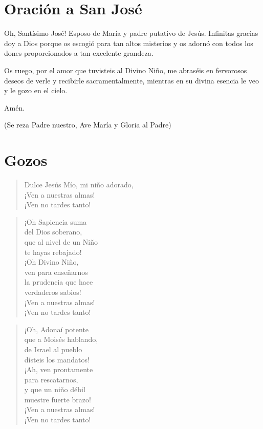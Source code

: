 \documentclass[spanish,utf8,12pt,twocolumn]{chlart}
\newenvironment{lectura}{\begingroup\color{lector}}{\endgroup\par}
\newenvironment{finalnotes}{\begingroup
	\footnotesize\sffamily\color{Gray}%
	\setlength{\leftskip}{3em}\setlength{\rightskip}{3em}\noindent
	}{\par\endgroup}
\newenvironment{gozo}{\begin{verse}\color{lector}}{\end{verse}}
\newcommand*\vena{{\color{responden}\hspace{1em}¡Ven a nuestras almas!\\\hspace{1em}¡Ven no tardes tanto!}}
\begin{document}
\section{Oración a San José}
\begin{lectura}
Oh, Santísimo José!
Esposo de María y padre putativo de Jesús.
Infinitas gracias doy a Dios porque os escogió para tan altos misterios
y os adornó con todos los dones proporcionados a tan excelente grandeza.

Os ruego, por el amor que tuvisteis al Divino Niño, me abraséis en
fervorosos deseos de verle y recibirle sacramentalmente, mientras en su
divina esencia le veo y le gozo en el cielo.

Amén.
\end{lectura}
\begin{finalnotes}
(Se reza Padre nuestro, Ave María y Gloria al Padre)
\end{finalnotes}

\section{Gozos}

\begin{gozo}
Dulce Jesús Mío, mi niño adorado,\\
\vena
\end{gozo}

\begin{gozo}
¡Oh Sapiencia suma\\del Dios soberano,\\
que al nivel de un Niño\\te hayas rebajado!\\
¡Oh Divino Niño,\\ven para enseñarnos\\
la prudencia que hace\\verdaderos sabios!\\
\vena
\end{gozo}

\begin{gozo}
¡Oh, Adonaí potente\\
que a Moisés hablando,\\
de Israel al pueblo\\
dísteis los mandatos!\\
¡Ah, ven prontamente\\
para rescatarnos,\\
y que un niño débil\\
muestre fuerte brazo!\\
\vena
\end{gozo}
\end{document}
